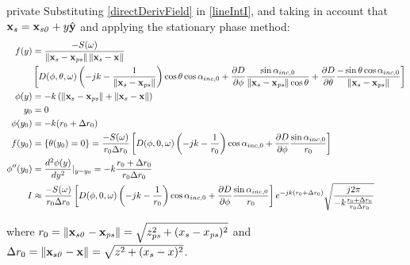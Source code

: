 \begin{shownto}{private}
Substituting \autoref{directDerivField} in \autoref{lineIntI}, and taking in account that $\PosTheo[surface] = \PosTheo[section] + y\hat{\vec{y}}$ and applying the stationary phase method:
\begin{align}
	f(y) &= \frac{-S(\omega)}{\norm{\PosTheo[surface] - \PosTheo[primarySource]} \norm{\PosTheo[surface] - \PosTheo}} \\ 
	&\left[ D(\azimuth, \elevation, \omega) \left(-jk - \frac{1}{\norm{\PosTheo[surface] - \PosTheo[primarySource]}}\right) \cos\elevation \cos\normPrimaryPropAngleSection + \frac{\partial D}{\partial \azimuth} \frac{\sin\normPrimaryPropAngleSection}{\norm{\PosTheo[surface] - \PosTheo[primarySource]} \cos \elevation} + \frac{\partial D}{\partial \elevation} \frac{-\sin\elevation \cos\normPrimaryPropAngleSection}{\norm{\PosTheo[surface] - \PosTheo[primarySource]}}  \right] \nonumber \\
	\phi(y) &= -k\left(\norm{\PosTheo[surface] - \PosTheo[primarySource]} + \norm{\PosTheo[surface] - \PosTheo}\right)\\
	y_0 &= 0 \\
	\phi(y_0) &= -k(\distLinePrimSource + \distLinePoint) \\
	f(y_0) &= \left\{ \elevation(y_0) = 0 \right\} = \frac{-S(\omega)}{\distLinePrimSource \distLinePoint} \left[ D(\azimuth, 0, \omega) \left(-jk - \frac{1}{\distLinePrimSource}\right) \cos\normPrimaryPropAngleSection + \frac{\partial D}{\partial \azimuth} \frac{\sin\normPrimaryPropAngleSection}{\distLinePrimSource} \right] \\
	\phi''(y_0) &= \frac{d^2\phi(y)}{dy^2}\rvert_{y = y_0} = -k\frac{\distLinePrimSource + \distLinePoint}{\distLinePrimSource \distLinePoint} \\
	I &\approx \frac{-S(\omega)}{\distLinePrimSource \distLinePoint} \left[ D(\azimuth, 0, \omega) \left(-jk - \frac{1}{\distLinePrimSource}\right) \cos\normPrimaryPropAngleSection + \frac{\partial D}{\partial \azimuth} \frac{\sin\normPrimaryPropAngleSection}{\distLinePrimSource} \right] e^{-jk(\distLinePrimSource + \distLinePoint)} \sqrt{\frac{j 2 \pi}{-k\frac{\distLinePrimSource + \distLinePoint}{\distLinePrimSource \distLinePoint}}}
\end{align}

where $\distLinePrimSource = \norm{\PosTheo[section] - \PosTheo[primarySource]} = \sqrt{z_{\PosTheoSubInd[primarySource]}^2 + (x_{\PosTheoSubInd[surface]} - x_{\PosTheoSubInd[primarySource]})^2}$ and $\distLinePoint = \norm{\PosTheo[section] - \PosTheo} = \sqrt{z^2 + (x_{\PosTheoSubInd[surface]} - x)^2}$.


\end{shownto}
